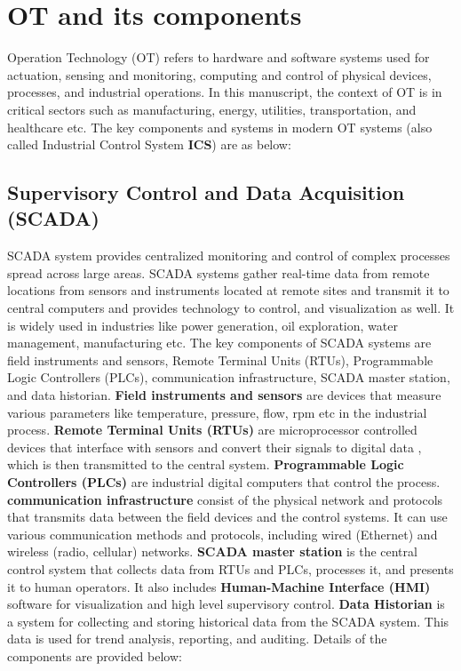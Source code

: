 \section{OT and its components}
\label{sec:ot}

Operation Technology (OT) refers to hardware and software systems used for actuation, sensing and monitoring, computing and control of physical devices, processes, and industrial operations. In this manuscript, the context of  OT is in critical sectors such as manufacturing, energy, utilities, transportation, and healthcare etc. 
The key components and systems in modern OT systems (also called Industrial Control System \textbf{ICS}) are as below:

\subsection{Supervisory Control and Data Acquisition (SCADA)} SCADA system provides centralized monitoring and control of complex processes spread across large areas. SCADA systems gather real-time data from remote locations from sensors and instruments located at remote sites \cite{waqas2024smart} and transmit it to central computers and provides technology to control, and visualization as well. It is widely used in industries like power generation, oil exploration, water management, manufacturing etc. The key components of SCADA systems are field instruments and sensors, Remote Terminal Units (RTUs), Programmable Logic Controllers (PLCs), communication infrastructure, SCADA master station, and data historian. \textbf{Field instruments and sensors} are devices that measure various parameters like temperature, pressure, flow, rpm etc in the industrial process. \textbf{Remote Terminal Units (RTUs)} are microprocessor controlled devices that interface with sensors and convert their signals to digital data \cite{misbahuddin2010fault}, which is then transmitted to the central system. \textbf{Programmable Logic Controllers (PLCs)} are  industrial digital computers that control the process. \textbf{communication infrastructure} consist of the physical network and protocols that transmits data between the field devices and the control systems. It can use various communication methods and protocols, including wired (Ethernet) and wireless (radio, cellular) networks. \textbf{SCADA master station} is the central control system that collects data from RTUs and PLCs, processes it, and presents it to human operators. It also includes \textbf{Human-Machine Interface (HMI)} software for visualization and high level supervisory control. \textbf{Data Historian} is a system for collecting and storing historical data from the SCADA system. This data is used for trend analysis, reporting, and auditing. Details of the components are provided below:
